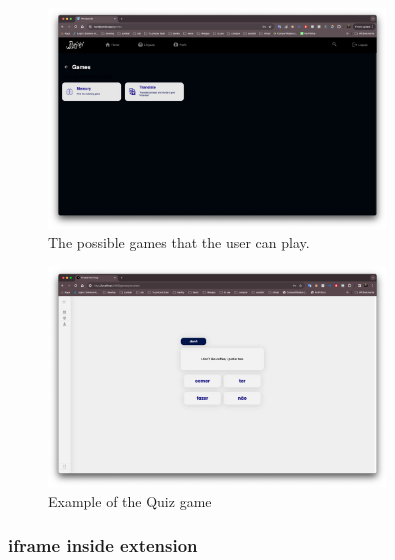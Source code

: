 \documentclass[12pt]{article}
\begin{document}
    \begin{figure}[h]
      \centering
      \caption{
      The possible games that the user can play.
      }
      \label{fig:site5}
      \includegraphics[width=0.8\textwidth]{assets/5.png}
    \end{figure}





    \begin{figure}[h]
      \centering
      \caption{
      Example of the Quiz game 
      }
      \label{fig:site8}
      \includegraphics[width=0.8\textwidth]{assets/8.png}
    \end{figure}
\subsubsection{iframe inside extension}
\end{document}
